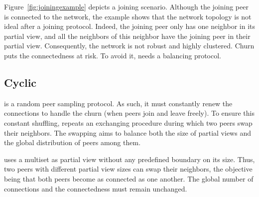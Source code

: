 \begin{figure*}
  \centering
  \subfloat[Figure A][Subscription]{
    }
  \hspace{40pt}
  \subfloat[Figure B][Forwarding]{
    }
  \hspace{40pt}
  \subfloat[Figure C][Connections]{
    }
  \caption{\label{fig:joiningexample}Example of the \SCAMPLON{}'s joining
    protocol. In this scenario, Peer $p_1$ contacts $p_2$ to join the network
    composed of $\{p_2,\,p_3,\,p_4,\,p_5,\,p_6\}$ (for simplicity sake, only
    the new connections and the neighborhood of $p_1$ and $p_2$ are
    displayed). Peer $p_1$ directly adds $p_2$ in its partial view. Peer $p_2$
    forwards the identity of $p_1$ to its neighborhood. Each of these neighbors
    adds $p_1$ in their partial view. Five connections have been established.}
\end{figure*}

\begin{algorithm}[h]

\caption{\label{algo:joiningalgo}The joining protocol of \SCAMPLON{}.}
\end{algorithm}

Figure~\ref{fig:joiningexample} depicts a joining scenario. Although the
joining peer is connected to the network, the example shows that the network
topology is not ideal after a joining protocol. Indeed, the joining peer only
has one neighbor in its partial view, and all the neighbors of this neighbor
have the joining peer in their partial view. Consequently, the network is not
robust and highly clustered. Churn puts the connectedness at risk. To avoid it,
\SCAMPLON{} needs a balancing protocol.

\subsection{Cyclic}
\label{subsec:cyclic}

\SCAMPLON{} is a random peer sampling protocol. As such, it must constantly
renew the connections to handle the churn (when peers join and leave freely).
To ensure this constant shuffling, \SCAMPLON{} repeats an exchanging procedure
during which two peers swap their neighbors. The swapping aims to balance both
the size of partial views and the global distribution of peers among them.

\SCAMPLON{} uses a multiset as partial view without any predefined boundary on
its size. Thus, two peers with different partial view sizes can swap their
neighbors, the objective being that both peers become as connected as one
another. The global number of connections and the connectedness must remain
unchanged.

